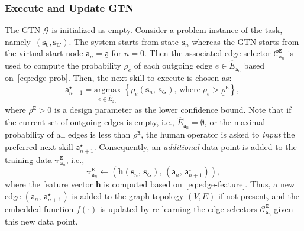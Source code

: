 \subsubsection{Execute and Update GTN}\label{subsubsec:update-gtn}
The GTN $\mathcal{G}$ is initialized as empty.
Consider a problem instance of the task, namely~$(\mathbf{s}_0, \mathbf{s}_G)$.
The system starts from state $\mathbf{s}_n$ whereas the GTN starts from the virtual start node $\mathsf{a}_n=\underline{\mathsf{a}}$ for $n=0$. 
Then the associated edge selector $\mathcal{C}_{\mathsf{a}_n}^{\texttt{E}}$ is used to compute the probability $\rho_e$ of each outgoing edge $e\in \widehat{E}_{\mathsf{a}_n}$ based on~\eqref{eq:edge-prob}.
Then, the next skill to execute is chosen as:
\begin{equation}\label{eq:next-skill}
\mathsf{a}^\star_{n+1}=
\underset{e\in \widehat{E}_{\mathsf{a}_n}}{\mathrm{argmax}}
\;\left\{\rho_e(\mathbf{s}_n,\,\mathbf{s}_G),\, \text{where}\; \rho_e>\underline{\rho}^{\texttt{E}}\right\},\;
\end{equation}
where $\underline{\rho}^{\texttt{E}}>0$ is a design parameter as the lower confidence bound.
Note that if the current set of outgoing edges is empty, i.e., $\widehat{E}_{\mathsf{a}_n}=\emptyset$, 
{or} the maximal probability of all edges is less than $\underline{\rho}^{\texttt{E}}$, 
the human operator is asked to \emph{input} the preferred next skill $\mathsf{a}^\star_{n+1}$. 
Consequently, an \emph{additional} data point is added to the training data $\boldsymbol{\tau}_{\mathsf{a}_n}^{\texttt{E}}$, i.e., 
\begin{equation}\label{eq:human-input-1}
\boldsymbol{\tau}_{\mathsf{a}_n}^{\texttt{E}} \leftarrow \left( \mathbf{h}(\mathbf{s}_n,\,\mathbf{s}_G),\,(\mathsf{a}_n,\, \mathsf{a}^\star_{n+1}) \right),
\end{equation}
where the feature vector $\mathbf{h}$ is computed based on~\eqref{eq:edge-feature}.
Thus, a new edge $(\mathsf{a}_n,\, \mathsf{a}^\star_{n+1})$ is added to the graph topology $(V, E)$ if not present, 
and the embedded function $f(\cdot)$ is updated by re-learning the edge selectors $\mathcal{C}_{\mathsf{a}_n}^{\texttt{E}}$ given this new data point. 


